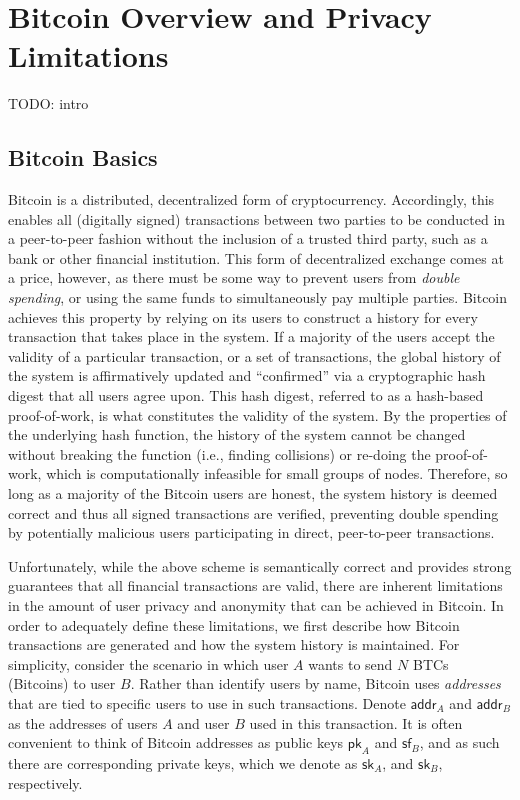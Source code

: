\section{Bitcoin Overview and Privacy Limitations}

TODO: intro

\subsection{Bitcoin Basics}

Bitcoin is a distributed, decentralized form of cryptocurrency. Accordingly, this enables all (digitally signed)  transactions between two parties to be conducted in a peer-to-peer fashion without the inclusion of a trusted third party, such as a bank or other financial institution. This form of decentralized exchange comes at a price, however, as there must be some way to prevent users from \emph{double spending}, or using the same funds to simultaneously pay multiple parties. Bitcoin achieves this property by relying on its users to construct a history for every transaction that takes place in the system. If a majority of the users accept the validity of a particular transaction, or a set of transactions, the global history of the system is affirmatively updated and ``confirmed'' via a cryptographic hash digest that all users agree upon. This hash digest, referred to as a hash-based proof-of-work, is what constitutes the validity of the system. By the properties of the underlying hash function, the history of the system cannot be changed without breaking the function (i.e., finding collisions) or re-doing the proof-of-work, which is computationally infeasible for small groups of nodes. Therefore, so long as a majority of the Bitcoin users are honest, the system history is deemed correct and thus all signed transactions are verified, preventing double spending by potentially malicious users participating in direct, peer-to-peer transactions. 

Unfortunately, while the above scheme is semantically correct and provides strong guarantees that all financial transactions are valid, there are inherent limitations in the amount of user privacy and anonymity that can be achieved in Bitcoin. In order to adequately define these limitations, we first describe how Bitcoin transactions are generated and how the system history is maintained. For simplicity, consider the scenario in which user $A$ wants to send $N$ BTCs (Bitcoins) to user $B$. Rather than identify users by name, Bitcoin uses \emph{addresses} that are tied to specific users to use in such transactions. Denote $\mathsf{addr}_A$ and $\mathsf{addr}_B$ as the addresses of users $A$ and user $B$ used in this transaction. It is often convenient to think of Bitcoin addresses as public keys $\mathsf{pk}_A$ and $\mathsf{sf}_B$, and as such there are corresponding private keys, which we denote as $\mathsf{sk}_A$, and $\mathsf{sk}_B$, respectively.

